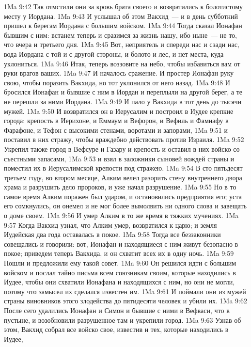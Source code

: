 \vs 1Ma 9:42 Так отмстили они за кровь брата своего и возвратились к болотистому месту у Иордана.
\vs 1Ma 9:43 И услышал об этом Вакхид~--- и в день субботний пришел к берегам Иордана с большим войском.
\vs 1Ma 9:44 Тогда сказал Ионафан бывшим с ним: встанем теперь и сразимся за жизнь нашу, ибо ныне~--- не то, что вчера и третьего дня.
\vs 1Ma 9:45 Вот, неприятель и спереди нас и сзади нас, вода Иордана с той и с другой стороны, и болото и лес, и нет места, куда уклониться.
\vs 1Ma 9:46 Итак, теперь воззовите на небо, чтобы избавиться вам от руки врагов ваших.
\vs 1Ma 9:47 И началось сражение. И простер Ионафан руку свою, чтобы поразить Вакхида, но тот уклонился от него назад.
\vs 1Ma 9:48 И бросился Ионафан и бывшие с ним в Иордан и переплыли на другой берег, а те не перешли за ними Иордана.
\vs 1Ma 9:49 И пало у Вакхида в тот день до тысячи мужей.
\vs 1Ma 9:50 И возвратился он в Иерусалим и построил в Иудее крепкие города: крепость в Иерихоне, и Еммаум и Вефорон, и Вефиль и Фамнафу в Фарафоне, и Тефон с высокими стенами, воротами и запорами,
\vs 1Ma 9:51 и поставил в них стражу, чтобы враждебно действовать против Израиля.
\vs 1Ma 9:52 Укрепил также город в Вефсуре и Газару и крепость и оставил в них войско со съестными запасами,
\vs 1Ma 9:53 и взял в заложники сыновей вождей страны и поместил их в Иерусалимской крепости под стражею.
\rsbpar\vs 1Ma 9:54 В сто пятьдесят третьем году, во втором месяце, Алким велел разорить стену внутреннего двора храма и разрушить дело пророков, и уже начал разрушение.
\vs 1Ma 9:55 Но в то самое время Алким поражен был ударом, и остановились предприятия его; уста его сомкнулись, он онемел и не мог более вымолвить ни одного слова и завещать о доме своем.
\vs 1Ma 9:56 И умер Алким в то же время в тяжких мучениях.
\vs 1Ma 9:57 Когда Вакхид узнал, что Алким умер, возвратился к царю; и земля Иудейская два года оставалась в покое.
\vs 1Ma 9:58 Тогда все беззаконники совещались и говорили: вот, Ионафан и находящиеся с ним живут безопасно в покое; приведем теперь Вакхида, и он схватит всех их в одну ночь.
\vs 1Ma 9:59 Пошли и предложили ему такой совет.
\vs 1Ma 9:60 Он решился идти с большим войском и послал тайно письма всем союзникам своим, которые находились в Иудее, чтобы они схватили Ионафана и находящихся с ним, но они не могли, потому что замысел их сделался известен им.
\vs 1Ma 9:61 И поймали они из мужей страны виновников этого злодейства до пятидесяти человек и убили их.
\vs 1Ma 9:62 После сего удалились Ионафан и Симон и бывшие с ними в Вефваси, что в пустыне, и возобновили разрушенное там и укрепили город.
\vs 1Ma 9:63 Узнав об этом, Вакхид собрал все войско свое, известив и тех, которые находились в Иудее,
